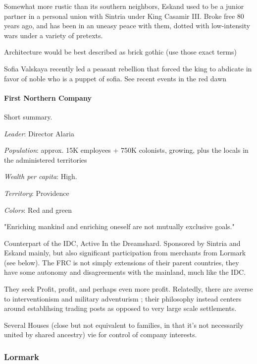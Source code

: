 Somewhat more rustic than its southern neighbors, Eskand used to be a junior partner in a personal union with Sintria under King Casamir III. Broke free 80 years ago, and has been in an uneasy peace with them, dotted with low-intensity wars under a variety of pretexts.
    

Architecture would be best described as brick gothic (use those exact terms)



Sofia Valskaya recently led a peasant rebellion that forced the king to abdicate in favor of noble who is a puppet of sofia. See recent events in the red dawn

\paragraph{First Northern Company}


Short summary.

\textit{Leader}: Director Alaria

\textit{Population}: approx. 15K employees + 750K colonists, growing, plus the locals in the administered territories

\textit{Wealth per capita}: High.

\textit{Territory}: Providence
    
\textit{Colors}: Red and green


\begin{rpg-quotebox}
"Enriching mankind and enriching oneself are not mutually exclusive goals."
\end{rpg-quotebox}


Counterpart of the IDC, Active In the Dreamshard. Sponsored by Sintria and Eskand mainly, but also significant participation from merchants from Lormark (see below).  
The FRC is not simply extensions of their parent countries, they have some autonomy and disagreements with the mainland, much like the IDC.

They seek Profit, profit, and perhaps even more profit. Relatedly, there are averse to interventionism and military adventurism ; their philosophy instead centers around establihsing trading posts as opposed to very large scale settlements.

Several Houses (close but not equivalent to families, in that it's not necessarily united by shared ancestry) vie for control of company interests.



\subsubsection{Lormark}

